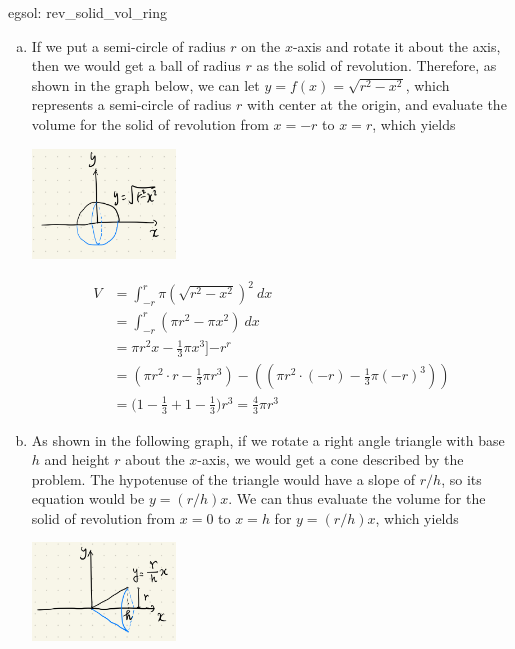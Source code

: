 \begin{egsol}[]{egsol: rev_solid_vol_ring}
    \begin{enumerate}[a)]
        \item If we put a semi-circle of radius $r$ on the $x$-axis and rotate it about the axis, then we would get a ball of radius $r$ as the solid of revolution.  Therefore, as shown in the graph below, we can let $y = f(x) = \sqrt{r^2-x^2}$, which represents a semi-circle of radius $r$ with center at the origin, and evaluate the volume for the solid of revolution from $x = -r$ to $x = r$, which yields
        \begin{center}
            \includegraphics[width = 0.3\textwidth]{figures/chap 07/rev_solid_ball.png}
        \end{center}
        \begin{align*}
            V &= \int_{-r}^r \pi (\sqrt{r^2-x^2})^2~dx\\
            &= \int_{-r}^r (\pi r^2 - \pi x^2) ~dx\\
            &= \pi r^2 x - \frac{1}{3} \pi x^3\big]{-r}^r\\
            &= (\pi r^2 \cdot r - \frac{1}{3} \pi r^3) - ((\pi r^2 \cdot (-r) - \frac{1}{3} \pi (-r)^3))\\
            &= \big(1-\frac{1}{3} + 1 - \frac{1}{3}\big)r^3 = \frac{4}{3}\pi r^3
        \end{align*}
        \item As shown in the following graph, if we rotate a right angle triangle with base $h$ and height $r$ about the $x$-axis, we would get a cone described by the problem.  The hypotenuse of the triangle would have a slope of $r/h$, so its equation would be $y = (r/h)x$.  We can thus evaluate the volume for the solid of revolution from $x = 0$ to $x = h$ for $y = (r/h) x$, which yields
        \begin{center}
            \includegraphics[width = 0.3\textwidth]{figures/chap 07/rev_solid_cone.png}

\end{center}
\end{enumerate}
\end{egsol}
